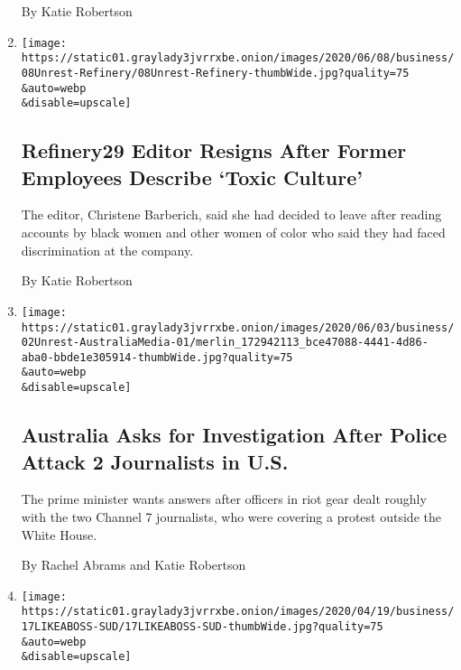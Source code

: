 \begin{enumerate}
  By Katie Robertson
\item
  \href{/2020/06/08/business/media/refinery-29-christene-barberich.html}{}

  \texttt{[image: https://static01.graylady3jvrrxbe.onion/images/2020/06/08/business/08Unrest-Refinery/08Unrest-Refinery-thumbWide.jpg?quality=75\\\&auto=webp\\\&disable=upscale]}

  \hypertarget{refinery29-editor-resigns-after-former-employees-describe-toxic-culture}{%
  \subsection{Refinery29 Editor Resigns After Former Employees Describe
  `Toxic
  Culture'}\label{refinery29-editor-resigns-after-former-employees-describe-toxic-culture}}

  The editor, Christene Barberich, said she had decided to leave after
  reading accounts by black women and other women of color who said they
  had faced discrimination at the company.

  By Katie Robertson
\item
  \href{/2020/06/02/business/media/australia-reporters-police-protest.html}{}

  \texttt{[image: https://static01.graylady3jvrrxbe.onion/images/2020/06/03/business/02Unrest-AustraliaMedia-01/merlin\_172942113\_bce47088-4441-4d86-aba0-bbde1e305914-thumbWide.jpg?quality=75\\\&auto=webp\\\&disable=upscale]}

  \hypertarget{australia-asks-for-investigation-after-police-attack-2-journalists-in-us}{%
  \subsection{Australia Asks for Investigation After Police Attack 2
  Journalists in
  U.S.}\label{australia-asks-for-investigation-after-police-attack-2-journalists-in-us}}

  The prime minister wants answers after officers in riot gear dealt
  roughly with the two Channel 7 journalists, who were covering a
  protest outside the White House.

  By Rachel Abrams and Katie Robertson
\item
  \href{/2020/04/17/business/vimeo-anjali-sud.html}{}

  \texttt{[image: https://static01.graylady3jvrrxbe.onion/images/2020/04/19/business/17LIKEABOSS-SUD/17LIKEABOSS-SUD-thumbWide.jpg?quality=75\\\&auto=webp\\\&disable=upscale]}


\end{enumerate}
